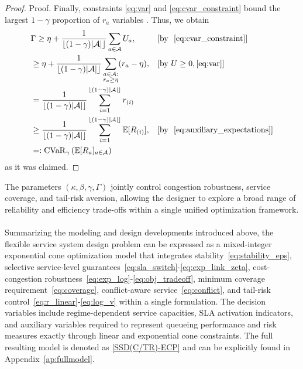 \documentclass[letter,11pt, reqno]{amsart}
\def\E{\mathbb{E}}
\def\A{\mathcal{A}}
\begin{document}
\begin{itemize}
\begin{proof}{Proof.}
Finally, constraints \eqref{eq:var} and \eqref{eq:cvar_constraint} bound the largest $1-\gamma$ proportion of $r_a$ variables \cite[see, e.g.,][for the formulation of the $k$-sum]{Ogryczak2003}. Thus, we obtain
\begin{align*}
    & \Gamma \geq  \eta + \frac{1}{\lfloor (1-\gamma)|\A|\rfloor}\sum_{a\in\mathcal{A}} U_a, && [\text{by }~\eqref{eq:cvar_constraint}]\\
    & \geq  \eta + \frac{1}{\lfloor (1-\gamma)|\A|\rfloor}\sum_{\substack{a\in\mathcal{A}:\\ r_a\ge \eta}}(r_a-\eta), && [\text{by } U\ge 0, \eqref{eq:var}] \\
    & = \frac{1}{\lfloor (1-\gamma)|\A|\rfloor} \sum_{i=1}^{\lfloor (1-\gamma)|\A|\rfloor} r_{(i)} && \\
    & \geq \frac{1}{\lfloor (1-\gamma)|\A|\rfloor} \sum_{i=1}^{\lfloor (1-\gamma)|\A|\rfloor} \E[R_{(i)}], && [\text{by }~\eqref{eq:auxiliary_expectations}]\\
    & =: {\rm CVaR}_\gamma\left(\E[R_a]_{a\in\A}\right) &&
\end{align*}
as it was claimed.%
\end{proof}


\end{itemize}

The parameters $(\kappa, \beta, \gamma, \Gamma)$ jointly control congestion robustness, service coverage, and tail-risk aversion, allowing the designer to explore a broad
range of reliability and efficiency trade-offs within a single unified
optimization framework.\\

\\

\noindent Summarizing the modeling and design developments introduced above, the flexible
service system design problem can be expressed as a mixed-integer exponential
cone optimization model that integrates stability~\eqref{eq:stability_eps}, selective service-level
guarantees~\eqref{eq:sla_switch}-\eqref{eq:exp_link_zeta}, cost-congestion robustness~\eqref{eq:exp_log}-\eqref{eq:obj_tradeoff}, minimum coverage requirement~\eqref{eq:coverage}, conflict-aware service~\eqref{eq:conflict}, and tail-risk control~\eqref{eq:r_linear}-\eqref{eq:log_v} 
within a single formulation. The decision variables include regime-dependent
service capacities, SLA activation indicators, and
auxiliary variables required to represent queueing performance and risk measures
exactly through linear and exponential cone constraints. The full resulting model is denoted as  \ref{SSD(C/TR)-ECP} and can be explicitly found in Appendix~\ref{ap:fullmodel}.
\end{document}
